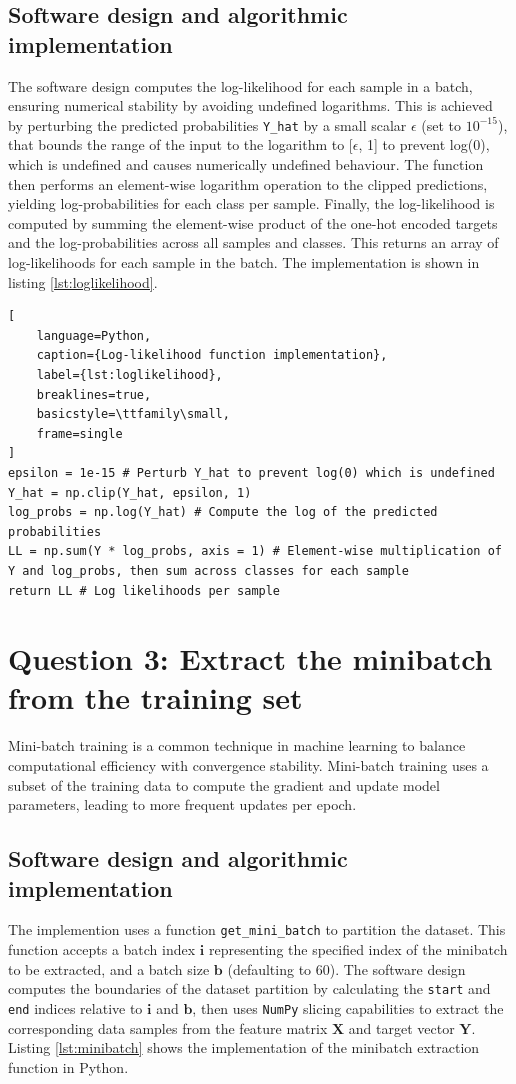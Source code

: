 \documentclass[11pt]{article}
\begin{document}
\subsection*{Software design and algorithmic implementation}
The software design computes the log-likelihood for each sample in a batch, ensuring numerical stability by avoiding undefined logarithms. This is achieved by perturbing the predicted probabilities \texttt{Y\_hat} by a small scalar $\epsilon$ (set to $10^{-15}$),
that bounds the range of the input to the logarithm to [$\epsilon$, 1] to prevent log(0), which is undefined and causes numerically undefined behaviour. The function then performs an element-wise logarithm operation to the clipped predictions, yielding log-probabilities 
for each class per sample. Finally, the log-likelihood is computed by summing the element-wise product of the one-hot encoded targets and the log-probabilities across all samples and classes. This returns 
an array of log-likelihoods for each sample in the batch.
 The implementation is shown in listing \ref{lst:loglikelihood}.
 \begin{lstlisting}[
    language=Python, 
    caption={Log-likelihood function implementation},
    label={lst:loglikelihood},
    breaklines=true,
    basicstyle=\ttfamily\small,
    frame=single
]
epsilon = 1e-15 # Perturb Y_hat to prevent log(0) which is undefined
Y_hat = np.clip(Y_hat, epsilon, 1)
log_probs = np.log(Y_hat) # Compute the log of the predicted probabilities
LL = np.sum(Y * log_probs, axis = 1) # Element-wise multiplication of Y and log_probs, then sum across classes for each sample
return LL # Log likelihoods per sample
\end{lstlisting}

\section*{Question 3: Extract the minibatch from the training set}
Mini-batch training is a common technique in machine learning to balance computational efficiency with convergence stability. 
Mini-batch training uses a subset of the training data to compute the gradient and update model parameters, leading to more frequent updates per epoch.

\subsection*{Software design and algorithmic implementation}
The implemention uses a function \texttt{get\_mini\_batch} to partition the dataset. This function accepts 
a batch index $\mathbf{i}$ representing the specified index of the minibatch to be extracted, and a batch size $\mathbf{b}$ (defaulting to 60).
The software design computes the boundaries of the dataset partition by calculating the \texttt{start} and \texttt{end} indices relative to $\mathbf{i}$ and $\mathbf{b}$,
then uses \texttt{NumPy} slicing capabilities to extract the corresponding data samples from the feature matrix $\mathbf{X}$ and target vector $\mathbf{Y}$.
Listing \ref{lst:minibatch} shows the implementation of the minibatch extraction function in Python.
\end{document}
